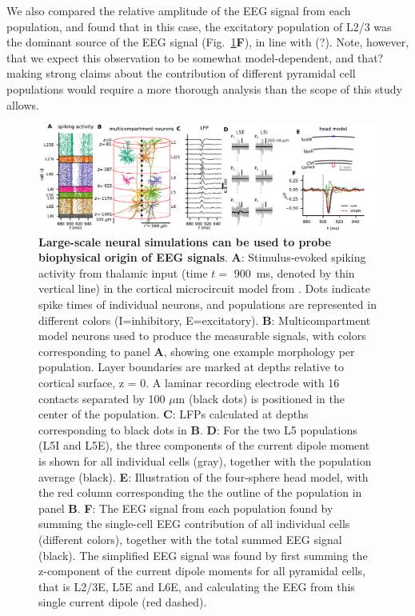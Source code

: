\documentclass[preprint,10pt,authoryear]{elsarticle}
\newcommand{\hlg}[2][Emerald]{ {\sethlcolor{#1} \hl{#2}} }
\newcommand{\sntxt}[1]{{\color{NavyBlue}#1}}
\newcommand{\tvnnote}[1]{\color{white}{\hlg{TVN: #1 }}\color{black}}
\begin{document}
We also compared the relative amplitude of the EEG signal from each population, and found that in this case, the excitatory population of L2/3 was the dominant source of the EEG signal (Fig.~\ref{fig:population}\textbf{F}), in line with (?)\tvnnote{(cite!)}. Note, however, that we expect this observation to be somewhat model-dependent, and \sntxt{that?} making strong claims about the contribution of different pyramidal cell populations would require a more thorough analysis than the scope of this study allows.

\begin{figure}[H]
	\centering
	\includegraphics[width=1.0\textwidth]{hybrid_with_EEG}
	\caption{\textbf{Large-scale neural simulations can be used to probe biophysical origin of EEG signals}. 
	\textbf{A}: Stimulus-evoked spiking activity from thalamic input (time $t= $ 900~ms, denoted by thin vertical line) in the cortical microcircuit model from \cite{POTJANS2014}. Dots indicate spike times of individual neurons, and populations are represented in different colors (I=inhibitory, E=excitatory).
	\textbf{B}: Multicompartment model neurons used to produce the measurable signals, with colors corresponding to panel \textbf{A}, showing one example morphology per population. Layer boundaries are marked at depths relative to cortical surface, z = 0. A laminar recording electrode with 16 contacts separated by
    100 $\mu$m (black dots) is positioned in the center of the population.
    \textbf{C}: LFPs calculated at depths corresponding to black dots in \textbf{B}.
    \textbf{D}: For the two L5 populations (L5I and L5E), the three components of the current dipole moment is shown for all individual cells (gray), together with the population average (black).
    \textbf{E}: Illustration of the four-sphere head model, with the red column corresponding the the outline of the population in panel \textbf{B}.
    \textbf{F}: The EEG signal from each population found by summing the single-cell EEG contribution of all individual cells (different colors), together with the total summed EEG signal (black). The simplified EEG signal was found by first summing the z-component of the current dipole moments for all pyramidal cells, that is L2/3E, L5E and L6E, and calculating the EEG from this single current dipole (red dashed).
	}
	\label{fig:population}
\end{figure}
\end{document}
